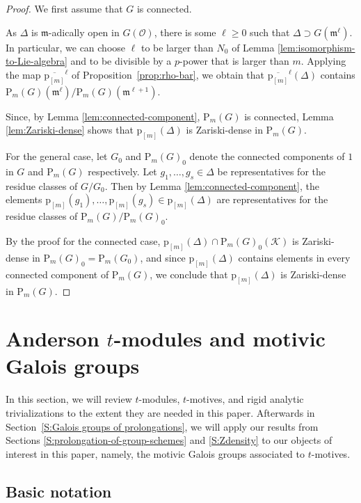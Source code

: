 \documentclass[10pt,a4paper]{amsart}
\theoremstyle{plain} %
\theoremstyle{definition}
\theoremstyle{remark}
\newcommand{\cK}{\mathcal{K}}   %
\newcommand{\cO}{\mathcal{O}}   %
\newcommand{\fm}{\mathfrak{m}}  %
\newcommand{\rP}[1]{\mathrm{P}_{\!#1}}
\newcommand{\prol}[1]{\mathrm{p}_{[#1]}}
\numberwithin{equation}{subsection}
\begin{document}
\begin{proof}
We first assume that $G$ is connected.

As $\Delta$ is $\fm$-adically open in $G(\cO)$, there is some $\ell\geq 0$ such that $\Delta\supset G(\fm^\ell)$. In particular, we can choose $\ell$ to be larger than $N_0$ of Lemma \ref{lem:isomorphism-to-Lie-algebra} and to be divisible by a $p$-power that is larger than $m$. Applying the map $\overline{\prol{m}}^\ell$ of Proposition~\ref{prop:rho-bar}, we obtain that $\overline{\prol{m}}^\ell(\Delta)$ contains $\rP{m}(G)(\fm^\ell)/\rP{m}(G)(\fm^{\ell+1})$.

Since, by Lemma \ref{lem:connected-component}, $\rP{m}(G)$ is connected, Lemma \ref{lem:Zariski-dense} shows that $\prol{m}(\Delta)$ is Zariski-dense in $\rP{m}(G)$.

For the general case, let $G_0$ and $\rP{m}(G)_0$ denote the connected components of $1$ in $G$ and $\rP{m}(G)$ respectively. Let $g_1,\ldots, g_s\in \Delta$ be representatives for the residue classes of $G/G_0$. Then by Lemma \ref{lem:connected-component}, the elements $\prol{m}(g_1),\ldots, \prol{m}(g_s)\in \prol{m}(\Delta)$ are representatives for the residue classes of $\rP{m}(G)/\rP{m}(G)_0$.

By the proof for the connected case, $\prol{m}(\Delta)\cap \rP{m}(G)_0(\cK)$ is Zariski-dense in $\rP{m}(G)_0=\rP{m}(G_0)$, and since $\prol{m}(\Delta)$ contains elements in every connected component of $\rP{m}(G)$, we conclude that $\prol{m}(\Delta)$ is Zariski-dense in $\rP{m}(G)$.
\end{proof}


\section{Anderson \texorpdfstring{$t$}{t}-modules and motivic Galois groups}\label{S:t-modules-and-motivic-galois-groups}


 In this section, we will review $t$-modules, $t$-motives, and rigid analytic trivializations to the extent they are needed in this paper.
Afterwards in Section~\ref{S:Galois groups of prolongations}, we will apply our results from Sections \ref{S:prolongation-of-group-schemes} and \ref{S:Zdensity} to our objects of interest in this paper, namely, the motivic Galois groups associated to $t$-motives. 


\subsection{Basic notation}
\end{document}
